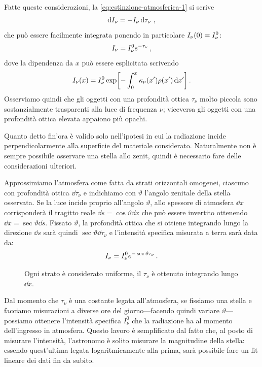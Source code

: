         Fatte queste considerazioni, la \eqref{eq:estinzione-atmosferica-1} si scrive
        \begin{equation}
            \label{eq:estinzione-atmosferica-2}
            \dd{I_\nu} = -I_\nu \dd{\tau_\nu}
            \,,
        \end{equation}
        che può essere facilmente integrata ponendo in particolare $I_\nu\pqty{0} = I_{\nu}^{\text{0}}$:
        \begin{equation}
            I_\nu = I_{\nu}^{\text{0}} e^{-\tau_\nu}
            \,,
        \end{equation}
        dove la dipendenza da $x$ può essere esplicitata scrivendo
        \begin{equation*}
            I_{\nu}\pqty{x} = I_{\nu}^{\text{0}} \exp[-\int_{0}^{x} \kappa_\nu\pqty{x'} \rho\pqty{x'} \dd{x'}]
            \myperiod
        \end{equation*}
        Osserviamo quindi che gli oggetti con una profondità ottica $\tau_\nu$ molto piccola sono sostanzialmente trasparenti alla luce di frequenza $\nu$; viceversa gli oggetti con una profondità ottica elevata appaiono più opachi.
        
        Quanto detto fin'ora è valido solo nell'ipotesi in cui la radiazione incide perpendicolarmente alla superficie del materiale considerato. Naturalmente non è sempre possibile osservare una stella allo zenit, quindi è necessario fare delle considerazioni ulteriori.

        Approssimiamo l'atmosfera come fatta da strati orizzontali omogenei, ciascuno con profondità ottica $\dd{\tau_\nu}$ e indichiamo con $\vartheta$ l'angolo zenitale della stella osservata. Se la luce incide proprio all'angolo $\vartheta$, allo spessore di atmosfera $\dd{x}$ corrisponderà il tragitto reale $\dd{s} = \cos{\vartheta}\dd{x}$ che può essere invertito ottenendo $\dd{x} = \sec{\vartheta}\dd{s}$. Fissato $\vartheta$, la profondità ottica che si ottiene integrando lungo la direzione $\dd{s}$ sarà quindi $\sec{\vartheta}\dd{\tau_\nu}$ e l'intensità specifica misurata a terra sarà data da:
        \begin{equation*}
            I_\nu = I_{\nu}^{0} e^{-\sec{\vartheta}\tau_\nu}
            \,.
        \end{equation*}
        \begin{figure}
            \label{fig:strati-atmo}
            \centering
            
            \caption{Ogni strato è considerato uniforme, il $\tau_\nu$ è ottenuto integrando lungo $\dd{x}$.}
        \end{figure}

        Dal momento che $\tau_{\nu}$ è una costante legata all'atmosfera, se fissiamo una stella e facciamo misurazioni a diverse ore del giorno---facendo quindi variare $\vartheta$---possiamo ottenere l'intensità specifica $I_{\nu}^0$ che la radiazione ha al momento dell'ingresso in atmosfera. Questo lavoro è semplificato dal fatto che, al posto di misurare l'intensità, l'astronomo è solito misurare la magnitudine della stella: essendo quest'ultima legata logaritmicamente alla prima, sarà possibile fare un fit lineare dei dati fin da subito.
        